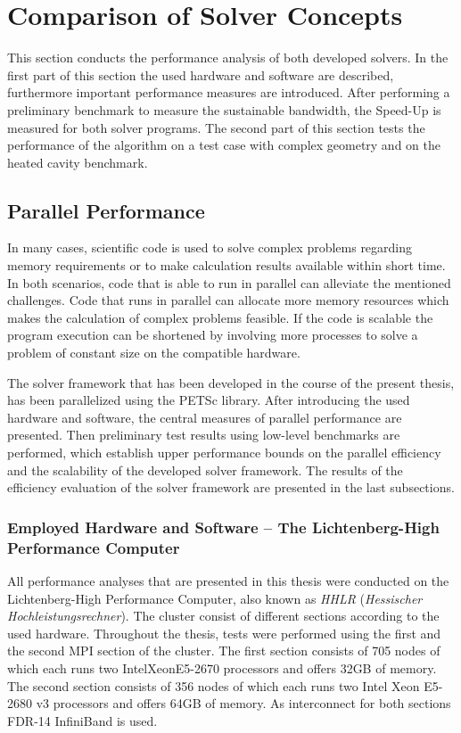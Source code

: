 \section{Comparison of Solver Concepts}
\label{sec:compare}

This section conducts the performance analysis of both developed solvers. In the first part of this section the used hardware and software are described, furthermore important performance measures are introduced. After performing a preliminary benchmark to measure the sustainable bandwidth, the Speed-Up is measured for both solver programs. The second part of this section tests the performance of the algorithm on a test case with complex geometry and on the heated cavity benchmark.
  
\subsection{Parallel Performance}

In many cases, scientific code is used to solve complex problems regarding memory requirements or to make calculation results available within short time. In both scenarios, code that is able to run in parallel can alleviate the mentioned challenges. Code that runs in parallel can allocate more memory resources which makes the calculation of complex problems feasible. If the code is scalable the program execution can be shortened by involving more processes to solve a problem of constant size on the compatible hardware.

The solver framework that has been developed in the course of the present thesis, has been parallelized using the PETSc library. After introducing the used hardware and software, the central measures of parallel performance are presented. Then preliminary test results using low-level benchmarks are performed, which establish upper performance bounds on the parallel efficiency and the scalability of the developed solver framework. The results of the efficiency evaluation of the solver framework are presented in the last subsections.

\subsubsection{Employed Hardware and Software -- The Lichtenberg-High Performance Computer }
\label{sec:hhlr}

All performance analyses that are presented in this thesis were conducted on the Lichtenberg-High Performance Computer, also known as \emph{HHLR} (\emph{Hessischer Hochleistungsrechner}). The cluster consist of different sections according to the used hardware. Throughout the thesis, tests were performed using the first and the second MPI section of the cluster. The first section consists of 705 nodes of which each runs two Intel\textregistered Xeon\textregistered E5-2670 processors and offers 32GB of memory. The second section consists of 356 nodes of which each runs two Intel Xeon E5-2680 v3 processors and offers 64GB of memory. As interconnect for both sections FDR-14 InfiniBand is used.

